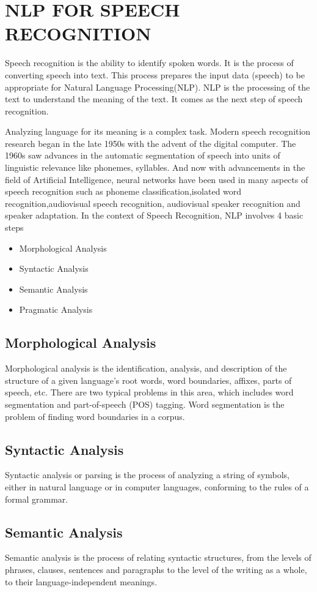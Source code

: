 \documentclass[sigconf]{acmart}
\begin{document}
\section{NLP FOR SPEECH RECOGNITION}
Speech recognition is the ability to identify spoken words. It is the process of converting speech into text. This process prepares the input data (speech) to be appropriate for Natural Language Processing(NLP). NLP is the processing of the text to understand the meaning of the text. It comes as the next step of speech recognition. 

Analyzing language for its meaning is a complex task. Modern speech recognition research began in the late 1950s with the advent of the digital computer. The 1960s saw advances in the automatic segmentation of speech into units of linguistic relevance like phonemes, syllables. And now with advancements in the field of Artificial Intelligence, neural networks have been used in many aspects of speech recognition such as phoneme classification,isolated word recognition,audiovisual speech recognition, audiovisual speaker recognition and speaker adaptation. In the context of Speech Recognition, NLP involves 4 basic steps
  \begin{itemize}
     \item Morphological Analysis
     \item Syntactic Analysis
     \item Semantic Analysis
     \item Pragmatic Analysis
  \end{itemize}

\subsection{Morphological Analysis}
Morphological analysis is the identification, analysis, and description of the structure of a given language’s root words, word boundaries, affixes, parts of speech, etc. There are two typical problems in this area, which includes word segmentation and part-of-speech (POS) tagging. Word segmentation is the problem of finding word boundaries in a corpus. 
\subsection{Syntactic Analysis}
Syntactic analysis or parsing is the process of analyzing a string of symbols, either in natural language or in computer languages, conforming to the rules of a formal grammar.
\subsection{Semantic Analysis}
Semantic analysis is the process of relating syntactic structures, from the levels of phrases, clauses, sentences and paragraphs to the level of the writing as a whole, to their language-independent meanings.
\end{document}

